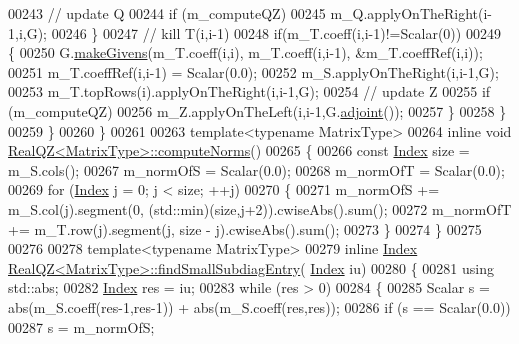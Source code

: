 \begin{DoxyCode}
00243             \textcolor{comment}{// update Q}
00244             \textcolor{keywordflow}{if} (m\_computeQZ)
00245               m\_Q.applyOnTheRight(i-1,i,G);
00246           \}
00247           \textcolor{comment}{// kill T(i,i-1)}
00248           \textcolor{keywordflow}{if}(m\_T.coeff(i,i-1)!=Scalar(0))
00249           \{
00250             G.\hyperlink{group___jacobi___module_af73c81e9cc139b7e0d877ce553b02ec0}{makeGivens}(m\_T.coeff(i,i), m\_T.coeff(i,i-1), &m\_T.coeffRef(i,i));
00251             m\_T.coeffRef(i,i-1) = Scalar(0.0);
00252             m\_S.applyOnTheRight(i,i-1,G);
00253             m\_T.topRows(i).applyOnTheRight(i,i-1,G);
00254             \textcolor{comment}{// update Z}
00255             \textcolor{keywordflow}{if} (m\_computeQZ)
00256               m\_Z.applyOnTheLeft(i,i-1,G.\hyperlink{group___jacobi___module_a89c8ea615f8fa77ddd5810a1e5fde4da}{adjoint}());
00257           \}
00258         \}
00259       \}
00260     \}
00261 
00263   \textcolor{keyword}{template}<\textcolor{keyword}{typename} MatrixType>
00264     \textcolor{keyword}{inline} \textcolor{keywordtype}{void} \hyperlink{group___eigenvalues___module_class_eigen_1_1_real_q_z}{RealQZ<MatrixType>::computeNorms}()
00265     \{
00266       \textcolor{keyword}{const} \hyperlink{group___eigenvalues___module_a6201e534e901b5f4e66f72c176b534a3}{Index} size = m\_S.cols();
00267       m\_normOfS = Scalar(0.0);
00268       m\_normOfT = Scalar(0.0);
00269       \textcolor{keywordflow}{for} (\hyperlink{group___eigenvalues___module_a6201e534e901b5f4e66f72c176b534a3}{Index} j = 0; j < size; ++j)
00270       \{
00271         m\_normOfS += m\_S.col(j).segment(0, (std::min)(size,j+2)).cwiseAbs().sum();
00272         m\_normOfT += m\_T.row(j).segment(j, size - j).cwiseAbs().sum();
00273       \}
00274     \}
00275 
00276 
00278   \textcolor{keyword}{template}<\textcolor{keyword}{typename} MatrixType>
00279     \textcolor{keyword}{inline} \hyperlink{group___eigenvalues___module_a6201e534e901b5f4e66f72c176b534a3}{Index} \hyperlink{group___eigenvalues___module_class_eigen_1_1_real_q_z}{RealQZ<MatrixType>::findSmallSubdiagEntry}(
      \hyperlink{group___eigenvalues___module_a6201e534e901b5f4e66f72c176b534a3}{Index} iu)
00280     \{
00281       \textcolor{keyword}{using} std::abs;
00282       \hyperlink{group___eigenvalues___module_a6201e534e901b5f4e66f72c176b534a3}{Index} res = iu;
00283       \textcolor{keywordflow}{while} (res > 0)
00284       \{
00285         Scalar s = abs(m\_S.coeff(res-1,res-1)) + abs(m\_S.coeff(res,res));
00286         \textcolor{keywordflow}{if} (s == Scalar(0.0))
00287           s = m\_normOfS;

\end{DoxyCode}
